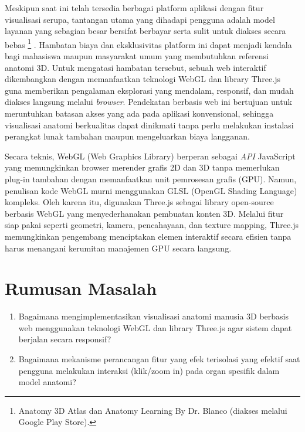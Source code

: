 \documentclass[a4paper,twoside]{article}
\begin{document}
         Meskipun saat ini telah tersedia berbagai platform aplikasi dengan fitur visualisasi serupa, tantangan utama yang dihadapi pengguna adalah model layanan yang sebagian besar bersifat berbayar serta sulit untuk diakses secara bebas \footnote{Anatomy 3D Atlas dan Anatomy Learning By Dr. Blanco (diakses melalui Google Play Store).} . Hambatan biaya dan eksklusivitas platform ini dapat menjadi kendala bagi mahasiswa maupun masyarakat umum yang membutuhkan referensi anatomi 3D. Untuk mengatasi hambatan tersebut, sebuah web interaktif dikembangkan dengan memanfaatkan teknologi WebGL dan library Three.js guna memberikan pengalaman eksplorasi yang mendalam, responsif, dan mudah diakses langsung melalui \textit{browser}. Pendekatan berbasis web ini bertujuan untuk meruntuhkan batasan akses yang ada pada aplikasi konvensional, sehingga visualisasi anatomi berkualitas  dapat dinikmati tanpa perlu melakukan instalasi perangkat lunak tambahan maupun mengeluarkan biaya langganan.
         
         Secara teknis, WebGL (Web Graphics Library) berperan sebagai \textit{API} JavaScript yang memungkinkan browser merender grafis 2D dan 3D tanpa memerlukan plug-in tambahan dengan memanfaatkan unit pemrosesan grafis (GPU). Namun, penulisan kode WebGL murni menggunakan GLSL (OpenGL Shading Language)  kompleks. Oleh karena itu, digunakan Three.js sebagai library open-source berbasis WebGL yang menyederhanakan pembuatan konten 3D. Melalui fitur siap pakai seperti geometri, kamera, pencahayaan, dan texture mapping, Three.js memungkinkan pengembang menciptakan elemen interaktif secara efisien tanpa harus menangani kerumitan manajemen GPU secara langsung.
         
   

	
	\section{Rumusan Masalah}
    
    \begin{enumerate}
        \item Bagaimana mengimplementasikan visualisasi anatomi manusia 3D berbasis web menggunakan teknologi WebGL dan library Three.js agar sistem dapat berjalan secara responsif?
        \item Bagaimana mekanisme perancangan fitur yang efek terisolasi yang efektif saat pengguna melakukan interaksi (klik/zoom in) pada organ spesifik dalam model anatomi?
    \end{enumerate}
    
\end{document}
